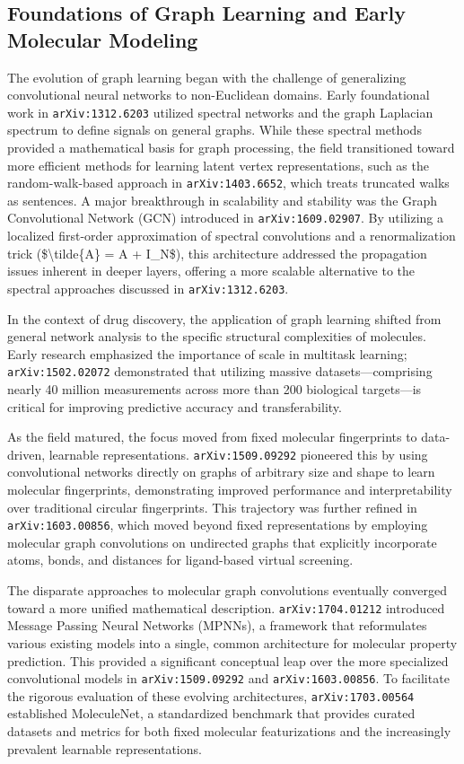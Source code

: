 \documentclass[11pt]{article}
\begin{document}
\subsection{Foundations of Graph Learning and Early Molecular Modeling}

The evolution of graph learning began with the challenge of generalizing convolutional neural networks to non-Euclidean domains. Early foundational work in \texttt{arXiv:1312.6203} utilized spectral networks and the graph Laplacian spectrum to define signals on general graphs. While these spectral methods provided a mathematical basis for graph processing, the field transitioned toward more efficient methods for learning latent vertex representations, such as the random-walk-based approach in \texttt{arXiv:1403.6652}, which treats truncated walks as sentences. A major breakthrough in scalability and stability was the Graph Convolutional Network (GCN) introduced in \texttt{arXiv:1609.02907}. By utilizing a localized first-order approximation of spectral convolutions and a renormalization trick (\$\textbackslash{}tilde\{A\} = A + I\_N\$), this architecture addressed the propagation issues inherent in deeper layers, offering a more scalable alternative to the spectral approaches discussed in \texttt{arXiv:1312.6203}.

In the context of drug discovery, the application of graph learning shifted from general network analysis to the specific structural complexities of molecules. Early research emphasized the importance of scale in multitask learning; \texttt{arXiv:1502.02072} demonstrated that utilizing massive datasets—comprising nearly 40 million measurements across more than 200 biological targets—is critical for improving predictive accuracy and transferability.

As the field matured, the focus moved from fixed molecular fingerprints to data-driven, learnable representations. \texttt{arXiv:1509.09292} pioneered this by using convolutional networks directly on graphs of arbitrary size and shape to learn molecular fingerprints, demonstrating improved performance and interpretability over traditional circular fingerprints. This trajectory was further refined in \texttt{arXiv:1603.00856}, which moved beyond fixed representations by employing molecular graph convolutions on undirected graphs that explicitly incorporate atoms, bonds, and distances for ligand-based virtual screening.

The disparate approaches to molecular graph convolutions eventually converged toward a more unified mathematical description. \texttt{arXiv:1704.01212} introduced Message Passing Neural Networks (MPNNs), a framework that reformulates various existing models into a single, common architecture for molecular property prediction. This provided a significant conceptual leap over the more specialized convolutional models in \texttt{arXiv:1509.09292} and \texttt{arXiv:1603.00856}. To facilitate the rigorous evaluation of these evolving architectures, \texttt{arXiv:1703.00564} established MoleculeNet, a standardized benchmark that provides curated datasets and metrics for both fixed molecular featurizations and the increasingly prevalent learnable representations.
\end{document}
